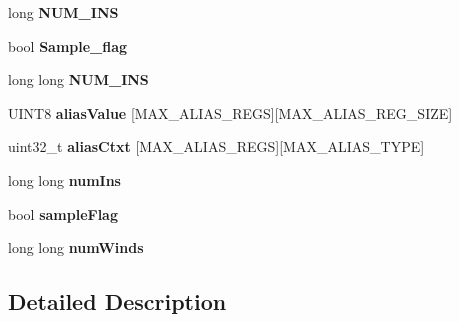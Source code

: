 \begin{DoxyCompactItemize}
\item 
\hypertarget{structRedSpyThreadData_a157b4d14268002f9d89f7f9311735670}{long {\bfseries N\-U\-M\-\_\-\-I\-N\-S}}\label{structRedSpyThreadData_a157b4d14268002f9d89f7f9311735670}

\item 
\hypertarget{structRedSpyThreadData_afbe6c4e6ac0277cbc56c880227526130}{bool {\bfseries Sample\-\_\-flag}}\label{structRedSpyThreadData_afbe6c4e6ac0277cbc56c880227526130}

\item 
\hypertarget{structRedSpyThreadData_a29b8d3af1306eec0067cbaccecbb4bdc}{long long {\bfseries N\-U\-M\-\_\-\-I\-N\-S}}\label{structRedSpyThreadData_a29b8d3af1306eec0067cbaccecbb4bdc}

\item 
\hypertarget{structRedSpyThreadData_acca3b70257441e9fe959130f89bf4dba}{U\-I\-N\-T8 {\bfseries alias\-Value} \mbox{[}M\-A\-X\-\_\-\-A\-L\-I\-A\-S\-\_\-\-R\-E\-G\-S\mbox{]}\mbox{[}M\-A\-X\-\_\-\-A\-L\-I\-A\-S\-\_\-\-R\-E\-G\-\_\-\-S\-I\-Z\-E\mbox{]}}\label{structRedSpyThreadData_acca3b70257441e9fe959130f89bf4dba}

\item 
\hypertarget{structRedSpyThreadData_a63f183fbec6697e3decec969fa2e52ba}{uint32\-\_\-t {\bfseries alias\-Ctxt} \mbox{[}M\-A\-X\-\_\-\-A\-L\-I\-A\-S\-\_\-\-R\-E\-G\-S\mbox{]}\mbox{[}M\-A\-X\-\_\-\-A\-L\-I\-A\-S\-\_\-\-T\-Y\-P\-E\mbox{]}}\label{structRedSpyThreadData_a63f183fbec6697e3decec969fa2e52ba}

\item 
\hypertarget{structRedSpyThreadData_a7c145dff1ab89352606c4c186318d66d}{long long {\bfseries num\-Ins}}\label{structRedSpyThreadData_a7c145dff1ab89352606c4c186318d66d}

\item 
\hypertarget{structRedSpyThreadData_afbdc939b2e4c466b34334582e06a8419}{bool {\bfseries sample\-Flag}}\label{structRedSpyThreadData_afbdc939b2e4c466b34334582e06a8419}

\item 
\hypertarget{structRedSpyThreadData_adbbfce2296d193cbf99d26a356c73a63}{long long {\bfseries num\-Winds}}\label{structRedSpyThreadData_adbbfce2296d193cbf99d26a356c73a63}

\end{DoxyCompactItemize}


\subsection{Detailed Description}


